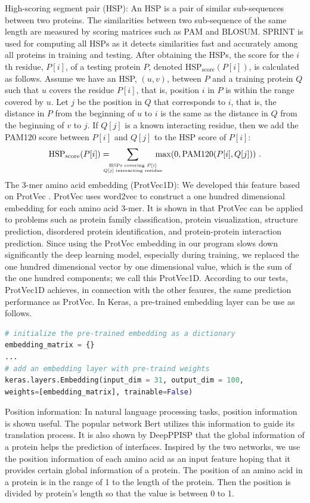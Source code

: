 High-scoring segment pair (HSP): An HSP is a pair of similar sub-sequences between two proteins. The similarities between two sub-sequence of the same length are measured by scoring matrices such as PAM and BLOSUM. SPRINT \cite{li2017sprint} is used for computing all HSPs as it detects similarities fast and accurately among all proteins in training and testing. After obtaining the HSPs, the score for the $i$th residue, $P[i]$, of a testing protein $P$, denoted $\text{HSP}_{\text{score}}(P[i])$, is calculated as follows. Assume we have an HSP, $(u,v)$, between $P$ and a training protein $Q$ such that $u$ covers the residue $P[i]$, that is, position $i$ in $P$ is within the range covered by $u$. Let $j$ be the position in $Q$ that corresponds to $i$, that is, the distance in $P$ from the beginning of $u$ to $i$ is the same as the distance in $Q$ from the beginning of $v$ to $j$. If $Q[j]$ is a known interacting residue, then we add the PAM120 score between $P[i]$ and $Q[j]$ to the HSP score of $P[i]$:
\[
\text{HSP}_{\text{score}}(P[i]) = \!\!\!\!\!\!\sum_{\stackrel{\text{\tiny HSPs covering $P[i]$}}{\text{\tiny $Q[j]$ interacting residue}}}\!\!\!\!\!\! \max(0, \text{PAM120}(P[i], Q[j])) \ .
\]
The 3-mer amino acid embedding (ProtVec1D): We developed this feature based on ProtVec \cite{asgari2015continuous}. ProtVec uses word2vec \cite{mikolov2013distributed} to construct a one hundred dimensional embedding for each amino acid 3-mer. It is shown in \cite{asgari2015continuous} that ProtVec can be applied to problems such as protein family classification, protein visualization, structure prediction, disordered protein identification, and protein-protein interaction prediction. Since using the ProtVec embedding in our program slows down significantly the deep learning model, especially during training, we replaced the one hundred dimensional vector by one dimensional value, which is the sum of the one hundred components; we call this ProtVec1D. According to our tests, ProtVec1D achieves, in connection with the other feaures, the same prediction performance as ProtVec. In Keras, a pre-trained embedding layer can be use as follows.
\begin{lstlisting}[language=python,frame=single]
# initialize the pre-trained embedding as a dictionary
embedding_matrix = {}
...
# add an embedding layer with pre-traind weights
keras.layers.Embedding(input_dim = 31, output_dim = 100,
weights=[embedding_matrix], trainable=False)
\end{lstlisting}

Position information: In natural language processing tasks, position information is shown useful. The popular network Bert \cite{devlin2018bert} utilizes this information to guide its translation process. It is also shown by DeepPPISP \cite{zeng2019protein} that the global information of a protein helps the prediction of interfaces. Inspired by the two networks, we use the position information of each amino acid as an input feature hoping that it provides certain global information of a protein. The position of an amino acid in a protein is in the range of 1 to the length of the protein. Then the position is divided by protein's length so that the value is between 0 to 1.

